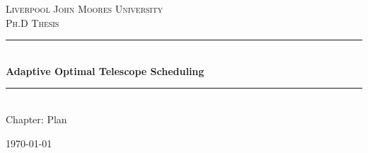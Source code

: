 \documentclass[12pt,a4paper]{article}
\newcommand{\HRule}{\rule{\linewidth}{0.5mm}}
\numberwithin{figure}{section}
\numberwithin{table}{section}
\numberwithin{algorithm}{section}
\begin{document}
\setlength{\parindent}{5mm}
\setlength{\parskip}{10pt plus2mm minus2mm}
\thispagestyle{empty}

\begin{titlepage}
 
\begin{center}
 
\textsc{\LARGE Liverpool John Moores University}\\[1.5cm]
 
\textsc{\Large Ph.D Thesis}\\[0.5cm]
 
 
\HRule \\[0.4cm]
{ \Large \bfseries Adaptive Optimal Telescope Scheduling}\\[0.4cm]
 
\HRule \\[1.5cm]
 
{ \large Chapter: Plan}
 
\vfill
 
{\large \today}
 
\end{center}
 
\end{titlepage}


\end{document}

